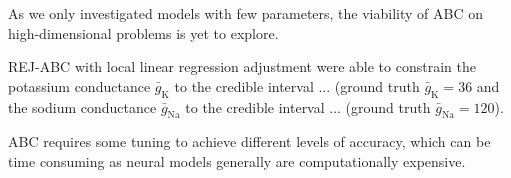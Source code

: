As we only investigated models with few parameters, the viability of ABC on high-dimensional problems is yet to explore. 


REJ-ABC with local linear regression adjustment were able to constrain the potassium conductance $\bar{g}_\mathrm{K}$ to the credible interval ... (ground truth $\bar{g}_\mathrm{K} = 36$ and the sodium conductance $\bar{g}_\mathrm{Na}$ to the credible interval ... (ground truth $\bar{g}_\mathrm{Na} = 120$).

ABC requires some tuning to achieve different levels of accuracy, which can be time consuming as neural models generally are computationally expensive. 